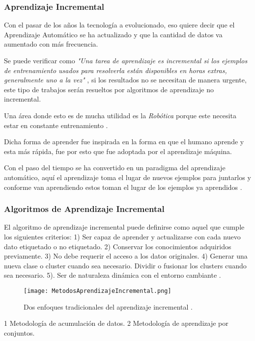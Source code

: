 \subsubsection{Aprendizaje Incremental}
 	
 	
 	Con el pasar de los años la tecnología a evolucionado, eso quiere decir que el Aprendizaje Automático se ha actualizado y que la 
        cantidad de datos va aumentado con más frecuencia.
        
        Se puede verificar como \textit{"Una tarea de aprendizaje es incremental si los ejemplos de entrenamiento usados para 
        resolverla están disponibles en horas extras, generalmente uno a la vez"} \cite{GiraudCarrier2000}, si los resultados no se 
        necesitan de manera urgente, este tipo de trabajos serán resueltos por algoritmos de aprendizaje no incremental. 

        Una área donde esto es de mucha utilidad es la \textit{Rob\'otica} porque este necesita estar en constante entrenamiento \cite{GiraudCarrier2000}.

        Dicha forma de aprender fue inspirada en la forma en que el humano aprende y esta más rápida, fue por esto que fue adoptada 
        por el aprendizaje m\'aquina.

        Con el paso del tiempo se ha convertido en un paradigma del aprendizaje automático, aquí el aprendizaje toma el lugar de nuevos ejemplos para juntarlos 
        y conforme van aprendiendo estos toman el lugar de los ejemplos ya aprendidos \cite{liu2015}.

        \subsubsection{Algoritmos de Aprendizaje Incremental}
        	
        	
        El algoritmo de aprendizaje incremental puede definirse como aquel que cumple los siguientes criterios:  
        1) Ser capaz de aprender y actualizarse con cada nuevo dato etiquetado o no etiquetado. 
        2) Conservar los conocimientos adquiridos previamente.
        3) No debe requerir el acceso a los datos originales. 
        4) Generar una nueva clase o cluster cuando sea necesario. Dividir o fusionar los clusters cuando sea necesario. 
        5). Ser de naturaleza dinámica con el entorno cambiante \cite{Deshmukh2013}.
        
        \begin{figure}[H]
        	\centering
        	\texttt{[image: MetodosAprendizajeIncremental.png]}
            \caption{Dos enfoques tradicionales del aprendizaje incremental \cite{Deshmukh2013}.}
            \label{fig:fig11}
        \end{figure} 
        1 Metodología de acumulación de datos. 2 Metodología de aprendizaje por conjuntos.\\
        

